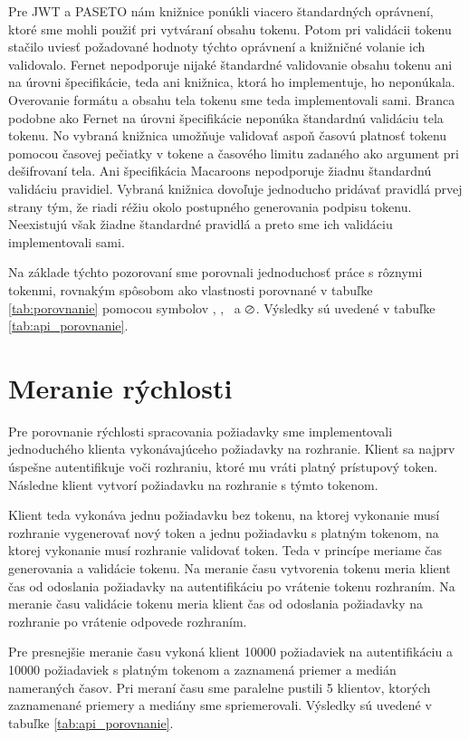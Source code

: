 Pre JWT a PASETO nám knižnice ponúkli viacero štandardných oprávnení, ktoré sme mohli použiť pri vytváraní obsahu tokenu. Potom pri validácii tokenu stačilo uviesť požadované hodnoty týchto oprávnení a knižničné volanie ich validovalo. Fernet nepodporuje nijaké štandardné validovanie obsahu tokenu ani na úrovni špecifikácie, teda ani knižnica, ktorá ho implementuje, ho neponúkala. Overovanie formátu a obsahu tela tokenu sme teda implementovali sami. Branca podobne ako Fernet na úrovni špecifikácie neponúka štandardnú validáciu tela tokenu. No vybraná knižnica umožňuje validovať aspoň časovú platnosť tokenu pomocou časovej pečiatky v tokene a časového limitu zadaného ako argument pri dešifrovaní tela. Ani špecifikácia Macaroons nepodporuje žiadnu štandardnú validáciu pravidiel. Vybraná knižnica dovoľuje jednoducho pridávať pravidlá prvej strany tým, že riadi réžiu okolo postupného generovania podpisu tokenu. Neexistujú však žiadne štandardné pravidlá a preto sme ich validáciu implementovali sami.

Na základe týchto pozorovaní sme porovnali jednoduchosť práce s rôznymi tokenmi, rovnakým spôsobom ako vlastnosti porovnané v tabuľke \ref{tab:porovnanie} pomocou symbolov \CIRCLE, \LEFTcircle, \Circle ~a $\varoslash$. Výsledky sú uvedené v tabuľke \ref{tab:api_porovnanie}.

\section{Meranie rýchlosti}

Pre porovnanie rýchlosti spracovania požiadavky sme implementovali jednoduchého klienta vykonávajúceho požiadavky na rozhranie. Klient sa najprv úspešne autentifikuje voči rozhraniu, ktoré mu vráti platný prístupový token. Následne klient vytvorí požiadavku na rozhranie s týmto tokenom.

Klient teda vykonáva jednu požiadavku bez tokenu, na ktorej vykonanie musí rozhranie vygenerovať nový token a jednu požiadavku s platným tokenom, na ktorej vykonanie musí rozhranie validovať token. Teda v princípe meriame čas generovania a validácie tokenu. Na meranie času vytvorenia tokenu meria klient čas od odoslania požiadavky na autentifikáciu po vrátenie tokenu rozhraním. Na meranie času validácie tokenu meria klient čas od odoslania požiadavky na rozhranie po vrátenie odpovede rozhraním.

Pre presnejšie meranie času vykoná klient 10000 požiadaviek na autentifikáciu a 10000 požiadaviek s platným tokenom a zaznamená priemer a medián nameraných časov. Pri meraní času sme paralelne pustili 5 klientov, ktorých zaznamenané priemery a mediány sme spriemerovali. Výsledky sú uvedené v tabuľke \ref{tab:api_porovnanie}.


